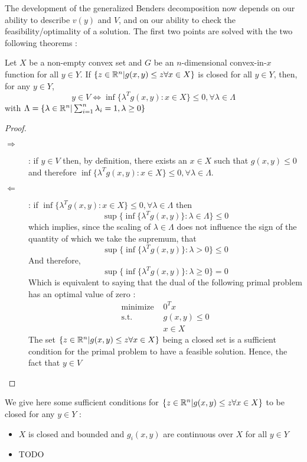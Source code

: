 The development of the generalized Benders decomposition now depends on our ability to describe $v(y)$ and $V$, and on our ability to check the feasibility/optimality of a solution. The first two points are solved with the two following theorems :
\begin{theorem}[$V$-representation]
    Let $X$ be a non-empty convex set and $G$ be an $n$-dimensional convex-in-$x$ function for all $y\in Y$. If $\{ z\in\mathbb R^n | g(x, y)\le z \forall x\in X \}$ is closed for all $y\in Y$, then, for any $y\in Y$,
    \[ y\in V \Leftrightarrow \inf\{ \lambda^Tg(x,y) : x\in X \} \le 0, \forall\lambda\in\Lambda \]
    with $\Lambda = \left\{ \lambda\in\mathbb R^n | \sum_{i=1}^n\lambda_i = 1, \lambda \ge 0 \right\}$
\end{theorem}
\begin{proof}
\leavevmode
\begin{description}
    \item[$\Rightarrow$] : if $y\in V$ then, by definition, there exists an $x\in X$ such that $g(x,y)\le 0$ and therefore $\inf\{ \lambda^Tg(x,y) : x\in X \} \le 0, \forall\lambda\in\Lambda$. 
    \item[$\Leftarrow$] : if $\inf\{ \lambda^Tg(x,y) : x\in X \} \le 0, \forall\lambda\in\Lambda$ then \[ \sup\{ \inf\{ \lambda^Tg(x,y) \} : \lambda\in\Lambda \} \le 0 \] which implies, since the scaling of $\lambda\in\Lambda$ does not influence the sign of the quantity of which we take the supremum, that  \[ \sup\{ \inf\{ \lambda^Tg(x,y) \} : \lambda> 0 \} \le 0 \]
    And therefore, \[ \sup\{ \inf\{ \lambda^Tg(x,y) \} : \lambda\ge 0 \} = 0 \] 
    Which is equivalent to saying that the dual of the following primal problem has an optimal value of zero : 
    \begin{align*}
        \textrm{minimize } & 0^Tx\\
        \textrm{s.t. } & g(x, y) \le 0\\
        & x\in X
    \end{align*}
    The set $\{ z\in\mathbb R^n | g(x, y)\le z \forall x\in X \}$ being a closed set is a sufficient condition for the primal problem to have a feasible solution. Hence, the fact that $y\in V$
\end{description}
\end{proof}
\begin{observation}
    We give here some sufficient conditions for $\{ z\in\mathbb R^n | g(x, y)\le z \forall x\in X \}$ to be closed for any $y\in Y$ :
    \begin{itemize}
        \item $X$ is closed and bounded and $g_i(x,y)$ are continuous over $X$ for all $y\in Y$
        \item TODO
    \end{itemize}
\end{observation}

